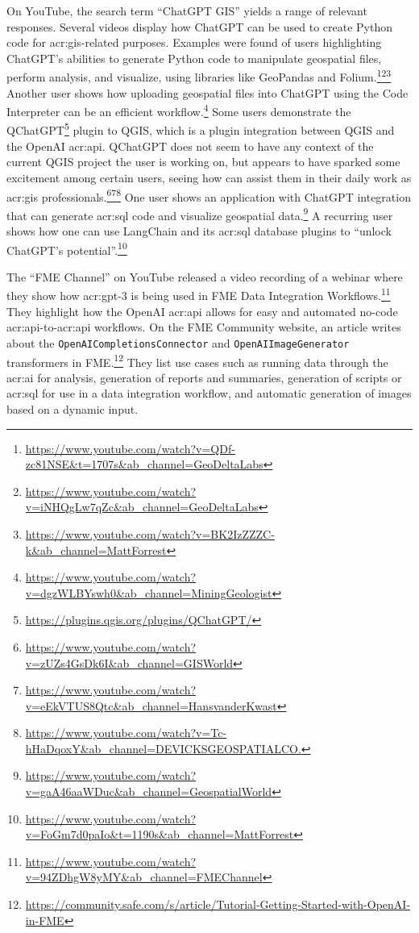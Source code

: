 On YouTube, the search term \enquote{ChatGPT GIS} yields a range of relevant responses. Several videos display how ChatGPT can be used to create Python code for \acrshort{acr:gis}-related purposes. Examples were found of users highlighting ChatGPT's abilities to generate Python code to manipulate geospatial files, perform analysis, and visualize, using libraries like GeoPandas and Folium.\footnote{\url{https://www.youtube.com/watch?v=QDf-zc81NSE&t=1707s&ab_channel=GeoDeltaLabs}}\footnote{\url{https://www.youtube.com/watch?v=iNHQgLw7qZc&ab_channel=GeoDeltaLabs}}\footnote{\url{https://www.youtube.com/watch?v=BK2IzZZZC-k&ab_channel=MattForrest}} Another user shows how uploading geospatial files into ChatGPT using the Code Interpreter can be an efficient workflow.\footnote{\url{https://www.youtube.com/watch?v=dgzWLBYswh0&ab_channel=MiningGeologist}} Some users demonstrate the QChatGPT\footnote{\url{https://plugins.qgis.org/plugins/QChatGPT/}} plugin to QGIS, which is a plugin integration between QGIS and the OpenAI \acrshort{acr:api}. QChatGPT does not seem to have any context of the current QGIS project the user is working on, but appears to have sparked some excitement among certain users, seeing how  can assist them in their daily work as \acrshort{acr:gis} professionals.\footnote{\url{https://www.youtube.com/watch?v=zUZs4GsDk6I&ab_channel=GISWorld}}\footnote{\url{https://www.youtube.com/watch?v=eEkVTUS8Qtc&ab_channel=HansvanderKwast}}\footnote{\url{https://www.youtube.com/watch?v=Tc-hHaDqoxY&ab_channel=DEVICKSGEOSPATIALCO.}} One user shows an application with ChatGPT integration that can generate \acrshort{acr:sql} code and visualize geospatial data.\footnote{\url{https://www.youtube.com/watch?v=gaA46aaWDuc&ab_channel=GeospatialWorld}} A recurring user shows how one can use LangChain and its \acrshort{acr:sql} database plugins to \enquote{unlock ChatGPT's potential}.\footnote{\url{https://www.youtube.com/watch?v=FoGm7d0paIo&t=1190s&ab_channel=MattForrest}}

The \enquote{FME Channel} on YouTube released a video recording of a webinar where they show how \acrshort{acr:gpt}-3 is being used in FME Data Integration Workflows.\footnote{\url{https://www.youtube.com/watch?v=94ZDhgW8yMY&ab_channel=FMEChannel}} They highlight how the OpenAI \acrshort{acr:api} allows for easy and automated no-code \acrshort{acr:api}-to-\acrshort{acr:api} workflows. On the FME Community website, an article writes about the \texttt{OpenAICompletionsConnector} and \texttt{OpenAIImageGenerator} transformers in FME.\footnote{\url{https://community.safe.com/s/article/Tutorial-Getting-Started-with-OpenAI-in-FME}} They list use cases such as running data through the \acrshort{acr:ai} for analysis, generation of reports and summaries, generation of scripts or \acrshort{acr:sql} for use in a data integration workflow, and automatic generation of images based on a dynamic input.

